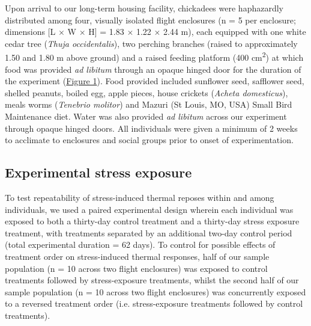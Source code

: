 \documentclass[12pt]{article}
\begin{document}
\noindent Upon arrival to our long-term housing facility, chickadees were haphazardly distributed among four, visually isolated flight enclosures (n = 5 per enclosure; dimensions [L $\times$ W $\times$ H] = 1.83 $\times$ 1.22 $\times$ 2.44 m), each equipped with one white cedar tree (\textit{Thuja occidentalis}), two perching branches (raised to approximately 1.50 and 1.80 m above ground) and a raised feeding platform (400 cm\textsuperscript{2}) at which food was provided \textit{ad libitum} through an opaque hinged door for the duration of the experiment (\hyperref[Fig4.1]{Figure 1}). Food provided included sunflower seed, safflower seed, shelled peanuts, boiled egg, apple pieces, house crickets (\textit{Acheta domesticus}), meals worms (\textit{Tenebrio molitor}) and Mazuri (St Louis, MO, USA) Small Bird Maintenance diet. Water was also provided \textit{ad libitum} across our experiment through opaque hinged doors. All individuals were given a minimum of 2 weeks to acclimate to enclosures and social groups prior to onset of experimentation. \vspace{0.5cm}

\subsection{Experimental stress exposure}
\vspace{0.5cm}

\noindent To test repeatability of stress-induced thermal reposes within and among individuals, we used a paired experimental design wherein each individual was exposed to both a thirty-day control treatment and a thirty-day stress exposure treatment, with treatments separated by an additional two-day control period (total experimental duration = 62 days). To control for possible effects of treatment order on stress-induced thermal responses, half of our sample population (n = 10 across two flight enclosures) was exposed to control treatments followed by stress-exposure treatments, whilst the second half of our sample population (n = 10 across two flight enclosures) was concurrently exposed to a reversed treatment order (i.e. stress-exposure treatments followed by control treatments). \vspace{1cm} 
\end{document}
